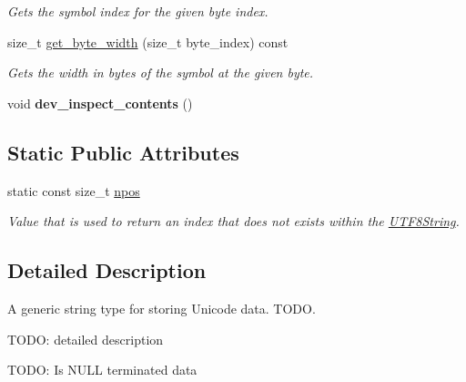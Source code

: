 \begin{DoxyCompactItemize}
\begin{DoxyCompactList}\small\item\em Gets the symbol index for the given byte index. \end{DoxyCompactList}\item 
size\-\_\-t \hyperlink{classchaos_1_1str_1_1_u_t_f8_string_a387abdce2189a379961844cd0a42a97a}{get\-\_\-byte\-\_\-width} (size\-\_\-t byte\-\_\-index) const 
\begin{DoxyCompactList}\small\item\em Gets the width in bytes of the symbol at the given byte. \end{DoxyCompactList}\item 
\hypertarget{classchaos_1_1str_1_1_u_t_f8_string_a28cdd164c2611809fb191764b6734a03}{void {\bfseries dev\-\_\-inspect\-\_\-contents} ()}\label{classchaos_1_1str_1_1_u_t_f8_string_a28cdd164c2611809fb191764b6734a03}

\end{DoxyCompactItemize}
\subsection*{Static Public Attributes}
\begin{DoxyCompactItemize}
\item 
\hypertarget{classchaos_1_1str_1_1_u_t_f8_string_a7e301ebfad4cd1b14e3a13cb0595b43b}{static const size\-\_\-t \hyperlink{classchaos_1_1str_1_1_u_t_f8_string_a7e301ebfad4cd1b14e3a13cb0595b43b}{npos}}\label{classchaos_1_1str_1_1_u_t_f8_string_a7e301ebfad4cd1b14e3a13cb0595b43b}

\begin{DoxyCompactList}\small\item\em Value that is used to return an index that does not exists within the \hyperlink{classchaos_1_1str_1_1_u_t_f8_string}{U\-T\-F8\-String}. \end{DoxyCompactList}\end{DoxyCompactItemize}


\subsection{Detailed Description}
A generic string type for storing Unicode data. T\-O\-D\-O. 

T\-O\-D\-O\-: detailed description

T\-O\-D\-O\-: Is N\-U\-L\-L terminated data 

